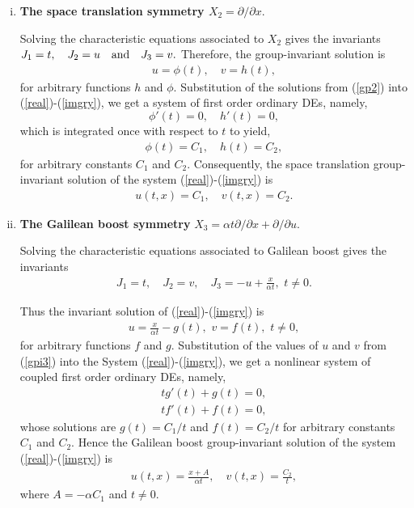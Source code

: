 \begin{enumerate} [(i)]
\begin{enumerate}[(a)]
\end{enumerate}
\item \textbf{The space  translation symmetry $X_2 = {\partial }/{\partial x}.$}

Solving the characteristic equations  associated to $X_2$ gives the invariants $J_1=t, \quad J_2 = u \quad  \text{and} \newline \quad J_3 =v.$ Therefore, the group-invariant solution is
\begin{align}
u =\phi(t), \quad  v= h(t), \label{gp2}	
\end{align}  for arbitrary functions $h$ and $\phi$. Substitution of the solutions from (\ref{gp2}) into  (\ref{real})-(\ref{imgry}), we get a system of first order ordinary DEs, namely,
\begin{equation}\phi'(t)=0, \quad h'(t)=0,
\end{equation} which is integrated once with respect to $t$ to  yield,
\begin{align}
\phi(t)=C_1, \quad h(t)=C_2,
\end{align} for arbitrary constants $C_1$ and $C_2$. Consequently, the space translation group-invariant solution  of the system (\ref{real})-(\ref{imgry}) is
\begin{align}
u(t,x)=C_1,  \quad  v(t,x)=C_2.
\end{align} 
\item  \textbf{The Galilean boost symmetry} $X_3 =  \alpha t { \partial }/{ \partial x}+{\partial }/{ \partial u}.$

Solving the characteristic equations associated to Galilean boost gives  the invariants
\begin{align}
J_1 =t, \quad  J_2 =v,   \quad  J_3 = -u + \frac{x}{ \alpha t}, \,\, t \neq 0.\label{onyan}
\end{align} 

Thus  the invariant solution of (\ref{real})-(\ref{imgry}) is
\begin{align} u = \frac{x}{ \alpha t}-g(t),  \,\,   v = f(t), \,\, t\neq 0, \label{gpi3}
\end{align}  for arbitrary functions $f$ and $g$.
Substitution of the values of $u$ and $v$ from (\ref{gpi3}) into the System (\ref{real})-(\ref{imgry}), we get a nonlinear system of coupled  first order ordinary DEs, namely,
\begin{align} tg'(t)+g(t)=0,\\
tf'(t)+ f(t) =0,
\end{align} whose solutions are $ g(t) = {C_1}/{t}$ and $f(t)= {C_2}/{t} $ for arbitrary constants $ C_1$ and $C_2$.
Hence the Galilean boost group-invariant solution of the system (\ref{real})-(\ref{imgry}) is
 \begin{align}
 u(t,x) =\frac{x+A}{\alpha t}, \quad  v(t,x)= \frac{C_2}{t},
\end{align} where $ A=-\alpha C_1$ and $ t \neq 0. $


\end{enumerate}
